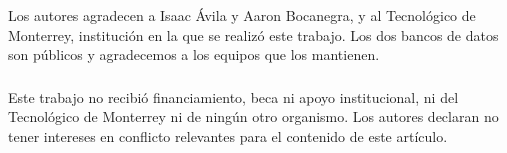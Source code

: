 \documentclass[runningheads]{llncs}
\newif\ifanon
\begin{document}







\appendix


\ifanon\else
\begin{credits}
\subsubsection{\ackname}
Los autores agradecen a Isaac Ávila y Aaron Bocanegra, y al Tecnológico de Monterrey,
institución en la que se realizó este trabajo. Los dos bancos de datos son públicos y
agradecemos a los equipos que los mantienen.

\subsubsection{\discintname}
Este trabajo no recibió financiamiento, beca ni apoyo institucional, ni del Tecnológico de
Monterrey ni de ningún otro organismo. Los autores declaran no tener intereses en conflicto
relevantes para el contenido de este artículo.
\end{credits}
\fi



\end{document}
